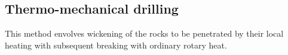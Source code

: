 \documentclass{article}
\begin{document}
\begin{multicols}{2}
  \subsection*{Thermo-mechanical drilling}
  This method envolves wickening of the rocks to be penetrated by their local heating with subsequent breaking with ordinary rotary heat.
  
\end{multicols}
\end{document}

